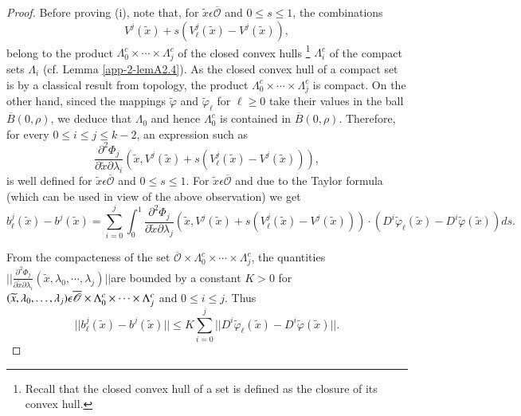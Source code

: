 \begin{proof}
Before proving (i), note that, for $\widetilde{x} \epsilon
\overline{\mathscr{O}}$ and $0 \leq s \leq 1$, the combinations
$$
V^{j}(\widetilde{x}) + s(V_{\ell}^{j}(\widetilde{x}) - V^{j}(\widetilde{x})),
$$
belong to the product $\Lambda_{0}^{c} \times \cdots \times
\Lambda_{j}^{c}$ of the closed convex hulls \footnote{Recall that the
  closed convex hull of a set is defined as the closure of its convex
  hull.} $\Lambda_{i}^{c}$ of the compact sets $\Lambda_{i}$
(cf. Lemma \ref{app-2-lemA2.4}). As the closed convex hull of a compact set is by a
classical result from topology, the product $\Lambda_{0}^{c} \times
\cdots \times \Lambda_{j}^{c}$ is compact. On the other hand, sinced
the mappings $\widetilde{\varphi}$ and $\widetilde{\varphi}_{\ell}$
for $\ell \geq 0$ take their values in the ball $\overline{B}(0,
\rho)$, we deduce that $\Lambda_{0}$ and hence $\Lambda_{0}^{c}$ is
contained in $\overline{B}(0, \rho)$. Therefore, for every $0 \leq i
\leq j \leq k-2$, an expression such as
$$ 
\frac{\partial^{2} \Phi_{j}}{\partial \widetilde{x} \partial
  \lambda_{i}} (\widetilde{x}, V^{j} (\widetilde{x}) +
s(V_{\ell}^{j}(\widetilde{x}) - V^{j}(\widetilde{x}))),
$$
is well defined for $\widetilde{x} \epsilon \overline{\mathscr{O}}$
and $0 \leq s \leq 1$. For $\widetilde{x} \epsilon
\overline{\mathscr{O}}$ and due to the Taylor formula (which can be
used in view of the above observation) we get
{\fontsize{10}{12}\selectfont
$$
b_{\ell}^{j}(\widetilde{x}) - b^{j}(\widetilde{x}) =
\sum\limits_{i=0}^{j} \int_{0}^{1} \frac{\partial^{2}
  \Phi_{j}}{\partial \widetilde{x} \partial \lambda_{j}}
(\widetilde{x}, V^{j} (\widetilde{x}) + s(V_{\ell}^{j}
(\widetilde{x})- V^{j}(\widetilde{x}))) \cdot
(D^{i}\widetilde{\varphi}_{\ell} (\widetilde{x}) -
D^{i}\widetilde{\varphi}(\widetilde{x})) ds.
$$}

From the compacteness of the set $\overline{\mathscr{O}} \times
\Lambda_{0}^{c} \times \cdots \times \Lambda_{j}^{c}$, the quantities
$||\frac{\partial^{2} \Phi_{j}}{\partial \widetilde{x} \partial
  \lambda_{i}} (\widetilde{x}, \lambda_{0}, \cdots,
\lambda_{j})||$\pageoriginale are bounded by a constant $K > 0$ for
$(\widetilde{x}, \lambda_{0}, \ldots,\break \lambda_{j}) \epsilon
\overline{\mathscr{O}} \times \Lambda_{0}^{c} \times \cdots \times
\Lambda_{j}^{c}$ and $0 \leq i \leq j$. Thus
$$
||b_{\ell}^{j}(\widetilde{x}) - b^{j}(\widetilde{x})|| \leq K
\sum\limits_{i=0}^{j} ||D^{i}\widetilde{\varphi}_{\ell}(\widetilde{x})
- D^{i}\widetilde{\varphi}(\widetilde{x})||.
$$


\end{proof}
